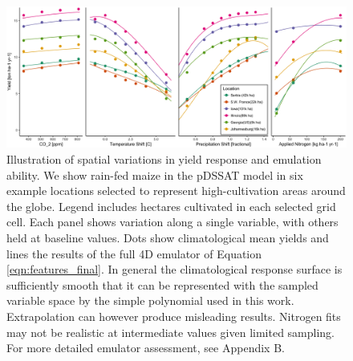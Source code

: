\documentclass[preprint, 5p, times, twocolumn]{elsarticle}
\begin{document}
\begin{figure}[!hb]
\centering
    \includegraphics[width=0.95\linewidth]{figures/regression_areas.png}
    \caption{Illustration of spatial variations in yield response and emulation ability. We show rain-fed maize in the pDSSAT model in six example locations selected to represent high-cultivation areas around the globe. Legend includes hectares cultivated in each selected grid cell. Each panel shows variation along a single variable, with others held at baseline values. Dots show climatological mean yields and lines the results of the full 4D emulator of Equation \ref{eqn:features_final}. In general the climatological response surface is sufficiently smooth that it can be represented with the sampled variable space by the simple polynomial used in this work. Extrapolation can however produce misleading results. Nitrogen fits may not be realistic at intermediate values given limited sampling. For more detailed emulator assessment, see Appendix B. %
}
   \label{fig:regression}
\end{figure}
\end{document}
